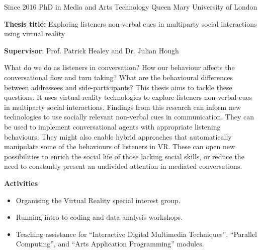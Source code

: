 \documentclass[]{friggeri-cv}
\begin{document}
\begin{entrylist}

    \entry
    {Since 2016}
    {PhD in Media and Arts Technology}
    {Queen Mary University of London}
    {
      \textbf{Thesis title:} Exploring listeners non-verbal cues in multiparty social interactions using virtual reality

      \textbf{Supervisor}: Prof. Patrick Healey and Dr. Julian Hough

      What do we do as listeners in conversation?
      How our behaviour affects the conversational flow and turn taking?
      What are the behavioural differences between addressees and side-participants?
      This thesis aims to tackle these questions.
      It uses virtual reality technologies to explore listeners non-verbal cues in multiparty social interactions.
      Findings from this research can inform new technologies to use socially relevant non-verbal cues in communication.
      They can be used to implement conversational agents with appropriate listening behaviours.
      They might also enable hybrid approaches that automatically manipulate some of the behaviours of listeners in VR.
      These can open new possibilities to enrich the social life of those lacking social skills, or reduce the need to constantly present an undivided attention in mediated conversations.

      \textbf{Activities}
      \begin{itemize}
        \item
          Organising the Virtual Reality special interest group.
        \item
          Running intro to coding and data analysis workshops.
	\item
	  Teaching assistance for ``Interactive Digital Multimedia Techniques'', ``Parallel Computing'', and ``Arts Application Programming'' modules.
      \end{itemize}
    }

\end{entrylist}
\end{document}
